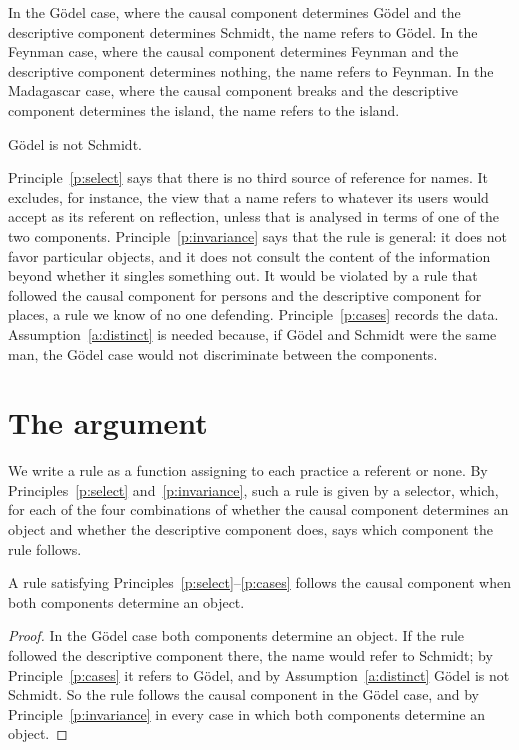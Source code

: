 \documentclass{situationist-preprint}
\begin{document}
\begin{principle}[Cases]\label{p:cases}
In the G\"odel case, where the causal component determines G\"odel and the descriptive component determines Schmidt, the name refers to G\"odel. In the Feynman case, where the causal component determines Feynman and the descriptive component determines nothing, the name refers to Feynman. In the Madagascar case, where the causal component breaks and the descriptive component determines the island, the name refers to the island.
\end{principle}

\begin{assumption}\label{a:distinct}
G\"odel is not Schmidt.
\end{assumption}

Principle~\ref{p:select} says that there is no third source of reference for names. It excludes, for instance, the view that a name refers to whatever its users would accept as its referent on reflection, unless that is analysed in terms of one of the two components. Principle~\ref{p:invariance} says that the rule is general: it does not favor particular objects, and it does not consult the content of the information beyond whether it singles something out. It would be violated by a rule that followed the causal component for persons and the descriptive component for places, a rule we know of no one defending. Principle~\ref{p:cases} records the data. Assumption~\ref{a:distinct} is needed because, if G\"odel and Schmidt were the same man, the G\"odel case would not discriminate between the components.

\section{The argument}

We write a rule as a function assigning to each practice a referent or none. By Principles~\ref{p:select} and~\ref{p:invariance}, such a rule is given by a selector, which, for each of the four combinations of whether the causal component determines an object and whether the descriptive component does, says which component the rule follows.

\begin{lemma}\label{l:goedel}
A rule satisfying Principles~\ref{p:select}--\ref{p:cases} follows the causal component when both components determine an object.
\end{lemma}

\begin{proof}
In the G\"odel case both components determine an object. If the rule followed the descriptive component there, the name would refer to Schmidt; by Principle~\ref{p:cases} it refers to G\"odel, and by Assumption~\ref{a:distinct} G\"odel is not Schmidt. So the rule follows the causal component in the G\"odel case, and by Principle~\ref{p:invariance} in every case in which both components determine an object.
\end{proof}
\end{document}
